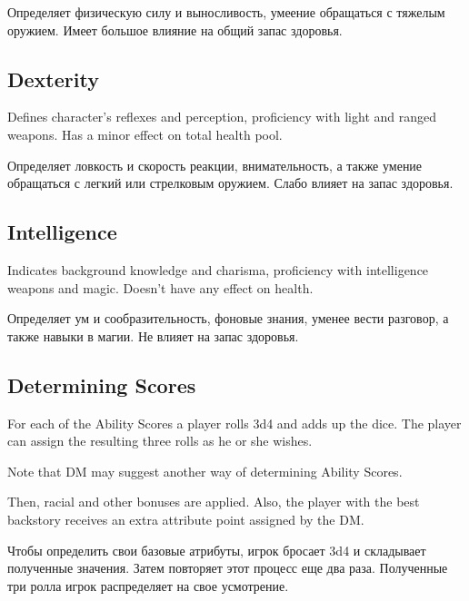 \documentclass[a5paper,11pt]{book}
\begin{document}
\begin{multicols}{2}
\begin{ru}
Определяет физическую силу и выносливость, умеение обращаться с тяжелым оружием. Имеет большое влияние на общий запас здоровья.
\end{ru}

\subsection{Dexterity}
\begin{en}
Defines character's reflexes and perception, proficiency with light and ranged weapons. Has a minor effect on total health pool.
\end{en}

\begin{ru}
Определяет ловкость и скорость реакции, внимательность, а также умение обращаться с легкий или стрелковым оружием. Слабо влияет на запас здоровья.
\end{ru}

\subsection{Intelligence}
\begin{en}
Indicates background knowledge and charisma, proficiency with intelligence weapons and magic. Doesn't have any effect on health.
\end{en}

\begin{ru}
Определяет ум и сообразительность, фоновые знания, уменее вести разговор, а также навыки в магии. Не влияет на запас здоровья.
\end{ru}

\subsection{Determining Scores}
\begin{en}
For each of the Ability Scores a player rolls 3d4 and adds up the dice. The player can assign the resulting three rolls as he or she wishes.

Note that DM may suggest another way of determining Ability Scores.

Then, racial and other bonuses are applied. Also, the player with the best backstory receives an extra attribute point assigned by the DM.
\end{en}

\begin{ru}
Чтобы определить свои базовые атрибуты, игрок бросает 3d4 и складывает полученные значения. Затем повторяет этот процесс еще два раза. Полученные три ролла игрок распределяет на свое усмотрение.


\end{ru}
\end{multicols}
\end{document}
